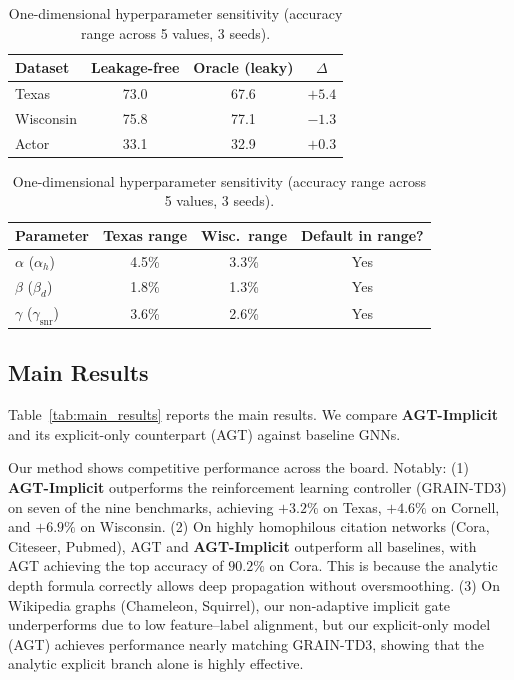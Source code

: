 \documentclass[letterpaper]{article}
\newcommand{\methodname}{\textbf{AGT-Implicit}}
\begin{document}
\begin{table}[t]
  \begin{minipage}{0.48\textwidth}
    \centering
    \caption{Leakage audit: leakage-free vs.\ oracle homophily (3 seeds, mean test accuracy \%).}
    \label{tab:leakage}
    \footnotesize
    \begin{tabular}{lccc}
      \toprule
      Dataset & Leakage-free & Oracle (leaky) & $\Delta$ \\
      \midrule
      Texas     & 73.0 & 67.6 & $+5.4$ \\
      Wisconsin & 75.8 & 77.1 & $-1.3$ \\
      Actor     & 33.1 & 32.9 & $+0.3$ \\
      \bottomrule
    \end{tabular}
  \end{minipage}
  \hfill
  \begin{minipage}{0.48\textwidth}
    \centering
    \caption{One-dimensional hyperparameter sensitivity (accuracy range across 5 values, 3 seeds).}
    \label{tab:sensitivity}
    \footnotesize
    \begin{tabular}{lccc}
      \toprule
      Parameter & Texas range & Wisc.\ range & Default in range? \\
      \midrule
      $\alpha$ ($\alpha_h$)   & 4.5\% & 3.3\% & Yes \\
      $\beta$  ($\beta_d$)    & 1.8\% & 1.3\% & Yes \\
      $\gamma$ ($\gamma_{\mathrm{snr}}$) & 3.6\% & 2.6\% & Yes \\
      \bottomrule
    \end{tabular}
  \end{minipage}
\end{table}

\subsection{Main Results}
Table~\ref{tab:main_results} reports the main results. We compare \methodname{} and its explicit-only counterpart (AGT) against baseline GNNs.

Our method shows competitive performance across the board. Notably:
(1) \methodname{} outperforms the reinforcement learning controller (GRAIN-TD3) on seven of the nine benchmarks, achieving $+3.2\%$ on Texas, $+4.6\%$ on Cornell, and $+6.9\%$ on Wisconsin.
(2) On highly homophilous citation networks (Cora, Citeseer, Pubmed), AGT and \methodname{} outperform all baselines, with AGT achieving the top accuracy of $90.2\%$ on Cora. This is because the analytic depth formula correctly allows deep propagation without oversmoothing.
(3) On Wikipedia graphs (Chameleon, Squirrel), our non-adaptive implicit gate underperforms due to low feature--label alignment, but our explicit-only model (AGT) achieves performance nearly matching GRAIN-TD3, showing that the analytic explicit branch alone is highly effective.
\end{document}
